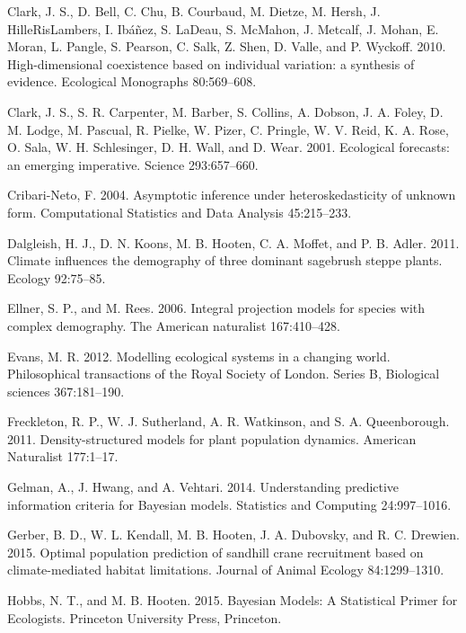 \documentclass[12pt,]{article}
\begin{document}
\hypertarget{ref-Clark2010}{}
Clark, J. S., D. Bell, C. Chu, B. Courbaud, M. Dietze, M. Hersh, J.
HilleRisLambers, I. Ibáñez, S. LaDeau, S. McMahon, J. Metcalf, J. Mohan,
E. Moran, L. Pangle, S. Pearson, C. Salk, Z. Shen, D. Valle, and P.
Wyckoff. 2010. High-dimensional coexistence based on individual
variation: a synthesis of evidence. Ecological Monographs 80:569--608.

\hypertarget{ref-Clark2001}{}
Clark, J. S., S. R. Carpenter, M. Barber, S. Collins, A. Dobson, J. A.
Foley, D. M. Lodge, M. Pascual, R. Pielke, W. Pizer, C. Pringle, W. V.
Reid, K. A. Rose, O. Sala, W. H. Schlesinger, D. H. Wall, and D. Wear.
2001. Ecological forecasts: an emerging imperative. Science
293:657--660.

\hypertarget{ref-Cribari-Neto2004}{}
Cribari-Neto, F. 2004. Asymptotic inference under heteroskedasticity of
unknown form. Computational Statistics and Data Analysis 45:215--233.

\hypertarget{ref-Dalgleish2011}{}
Dalgleish, H. J., D. N. Koons, M. B. Hooten, C. A. Moffet, and P. B.
Adler. 2011. Climate influences the demography of three dominant
sagebrush steppe plants. Ecology 92:75--85.

\hypertarget{ref-Ellner2006}{}
Ellner, S. P., and M. Rees. 2006. Integral projection models for species
with complex demography. The American naturalist 167:410--428.

\hypertarget{ref-Evans2012b}{}
Evans, M. R. 2012. Modelling ecological systems in a changing world.
Philosophical transactions of the Royal Society of London. Series B,
Biological sciences 367:181--190.

\hypertarget{ref-Freckleton2011}{}
Freckleton, R. P., W. J. Sutherland, A. R. Watkinson, and S. A.
Queenborough. 2011. Density-structured models for plant population
dynamics. American Naturalist 177:1--17.

\hypertarget{ref-Gelman2014}{}
Gelman, A., J. Hwang, and A. Vehtari. 2014. Understanding predictive
information criteria for Bayesian models. Statistics and Computing
24:997--1016.

\hypertarget{ref-Gerber2015}{}
Gerber, B. D., W. L. Kendall, M. B. Hooten, J. A. Dubovsky, and R. C.
Drewien. 2015. Optimal population prediction of sandhill crane
recruitment based on climate-mediated habitat limitations. Journal of
Animal Ecology 84:1299--1310.

\hypertarget{ref-Hobbs2015}{}
Hobbs, N. T., and M. B. Hooten. 2015. Bayesian Models: A Statistical
Primer for Ecologists. Princeton University Press, Princeton.
\end{document}
